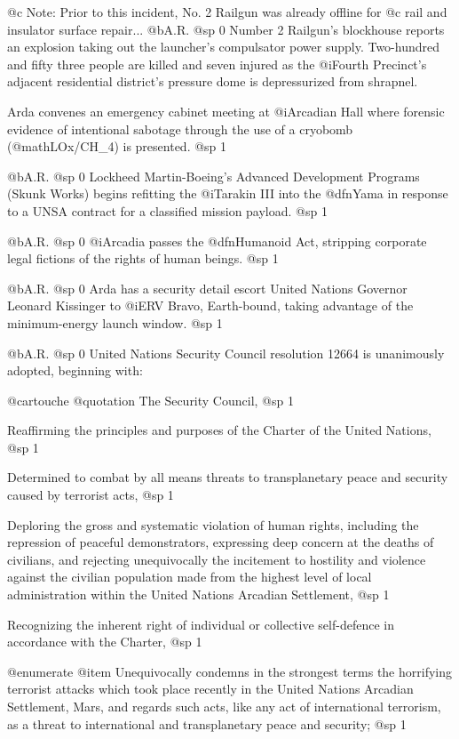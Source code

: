 @c Note: Prior to this incident, No. 2 Railgun was already offline for 
@c  rail and insulator surface repair...
@b{A.R.}
@sp 0
Number 2 Railgun's blockhouse reports an explosion taking out the launcher's compulsator power supply. Two-hundred and fifty three people are killed and seven injured as the @i{Fourth Precinct's} adjacent residential district's pressure dome is depressurized from shrapnel.

Arda convenes an emergency cabinet meeting at @i{Arcadian Hall} where forensic evidence of intentional sabotage through the use of a cryobomb (@math{LOx/CH_4}) is presented.
@sp 1

@b{A.R.}
@sp 0
Lockheed Martin-Boeing's Advanced Development Programs (Skunk Works) begins refitting the @i{Tarakin III} into the @dfn{Yama} in response to a UNSA contract for a classified mission payload.
@sp 1

@b{A.R.}
@sp 0
@i{Arcadia} passes the @dfn{Humanoid Act}, stripping corporate legal fictions of the rights of human beings.
@sp 1

@b{A.R.}
@sp 0
Arda has a security detail escort United Nations Governor Leonard Kissinger to @i{ERV Bravo}, Earth-bound, taking advantage of the minimum-energy launch window.
@sp 1

@b{A.R.}
@sp 0
United Nations Security Council resolution 12664 is unanimously adopted, beginning with:

@cartouche
@quotation
The Security Council,
@sp 1

Reaffirming the principles and purposes of the Charter of the United Nations,
@sp 1

Determined to combat by all means threats to transplanetary peace and security caused by terrorist acts,
@sp 1

Deploring the gross and systematic violation of human rights, including the repression of peaceful demonstrators, expressing deep concern at the deaths of civilians, and rejecting unequivocally the incitement to hostility and violence against the civilian population made from the highest level of local administration within the United Nations Arcadian Settlement,
@sp 1

Recognizing the inherent right of individual or collective self-defence in accordance with the Charter,
@sp 1

@enumerate
@item
Unequivocally condemns in the strongest terms the horrifying terrorist attacks which took place recently in the United Nations Arcadian Settlement, Mars, and regards such acts, like any act of international terrorism, as a threat to international and transplanetary peace and security;
@sp 1

